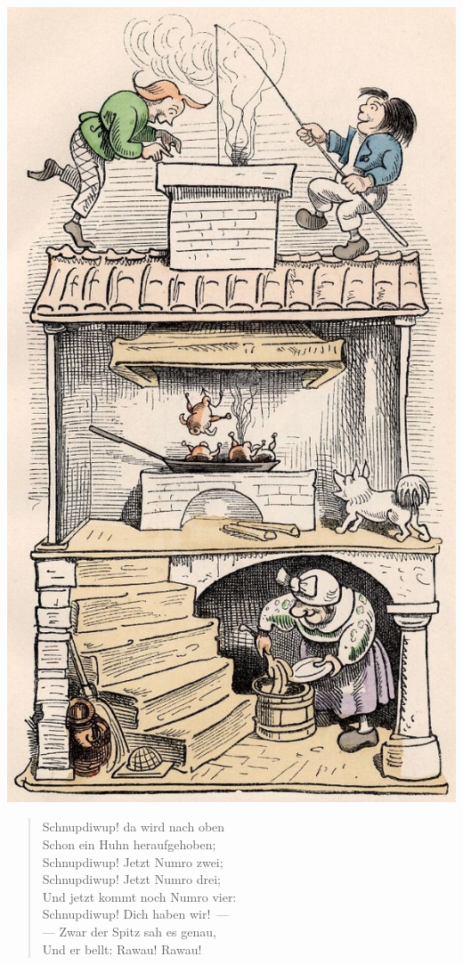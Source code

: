 \documentclass[a4paper,12pt]{article}
\begin{document}
\begin{center}
  \vspace*{-47pt}
  \includegraphics[scale=.7, alt={Im Haus tut sich was}]{images/2-05.jpg}
\end{center}



\begin{verse}
Schnupdiwup! da wird nach oben\\{}
Schon ein Huhn heraufgehoben;\\{}
Schnupdiwup! Jetzt Numro zwei;\\{}
Schnupdiwup! Jetzt Numro drei;\\{}
Und jetzt kommt noch Numro vier:\\{}
Schnupdiwup! Dich haben wir!~—\\{}
— Zwar der Spitz sah es genau,\\{}
Und er bellt: Rawau! Rawau!
\end{verse}
\end{document}
